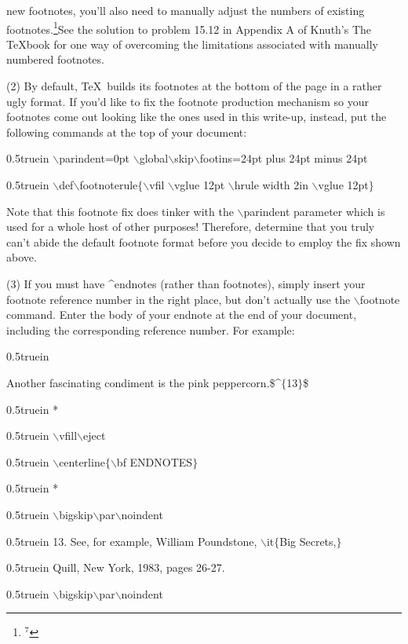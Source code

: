 new footnotes, you'll also need to manually adjust the numbers of existing
footnotes.\footnote{$^{7}$}{See the solution to problem 15.12 in 
Appendix A of Knuth's {\twlit The \TeX{}book} for one way of 
overcoming the limitations associated with manually numbered footnotes.}
\bigskip\par\noindent
(2) By default, \TeX\ builds its footnotes at the bottom of the page
in a rather ugly format. 
If you'd like to fix the footnote production mechanism so your footnotes 
come out looking like the ones used in this write-up, instead, 
put the following commands at the top of your document:
{\twltt 
\bigskip\par\noindent\hglue 0.5truein
$\backslash$parindent=0pt
$\backslash$global$\backslash$skip$\backslash$footins=24pt plus 24pt minus 24pt
\par\noindent\hglue 0.5truein
$\backslash$def$\backslash$footnoterule$\{${}$\backslash$vfil 
$\backslash$vglue 12pt $\backslash$hrule width 2in 
$\backslash$vglue 12pt$\}$}
\bigskip\par\noindent
Note that this footnote fix {\twlbf does} tinker with the {\twltt 
$\backslash$parindent} parameter which is used for a whole host of 
other purposes! Therefore, determine that you truly can't abide the
default footnote format before you decide to employ the fix shown above.
\bigskip\par\noindent
(3) If you must have ^{endnotes} (rather than footnotes), simply insert 
your footnote reference number in the right place, but don't actually use the 
{\twltt $\backslash$footnote} command. Enter the body of your endnote 
at the {\twlbf end} of your document, including the corresponding reference number.
For example:
\bigskip\par\noindent\hglue 0.5truein
{\twltt Another fascinating condiment is the pink
peppercorn.\${}\^{}$\{$13$\}${}\$
\bigskip\par\noindent\hglue 0.5truein
* \quad * \quad *
\bigskip\par\noindent\hglue 0.5truein
$\backslash$vfill$\backslash$eject
\par\noindent\hglue 0.5truein
$\backslash$centerline$\{${}$\backslash$bf ENDNOTES$\}$
\bigskip\par\noindent\hglue 0.5truein
* \quad * \quad *
\bigskip\par\noindent\hglue 0.5truein
$\backslash$bigskip$\backslash$par$\backslash$noindent
\par\noindent\hglue 0.5truein
13. See, for example, William Poundstone, 
$\backslash$it$\{$Big Secrets,$\}$
\par\noindent\hglue 0.5truein
Quill, New York, 1983, pages 26-27.
\par\noindent\hglue 0.5truein
$\backslash$bigskip$\backslash$par$\backslash$noindent}
